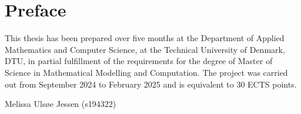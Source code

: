 \chapter*{Preface}
This thesis has been prepared over five months at the Department of Applied Mathematics and Computer Science, at the Technical University of Denmark, DTU, in partial fulfillment of the requirements for the degree of Master of Science in Mathematical Modelling and Computation.
The project was carried out from September 2024 to February 2025 and is equivalent to 30 ECTS points.

\vfill

\begin{center}
    
    Melissa Ulsøe Jessen (s194322)
\end{center}

\vfill

